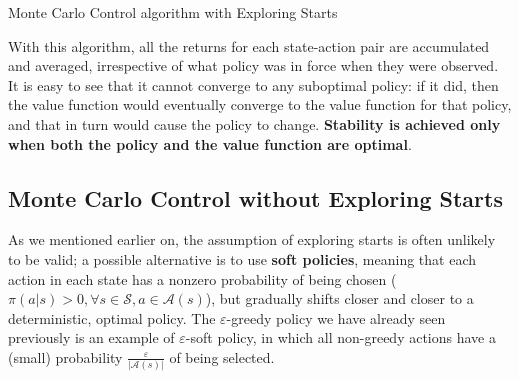 \begin{algorithm}[H]
\DontPrintSemicolon
\SetAlgoVlined
{}

 \caption{Monte Carlo Control algorithm with Exploring Starts}
\end{algorithm}

With this algorithm, all the returns for each state-action pair are accumulated and averaged, irrespective of what policy was in force when they were observed. It is easy to see that it cannot converge to any suboptimal policy: if it did, then the value function would eventually converge to the value function for that policy, and that in turn would cause the policy to change. \textbf{Stability is achieved only when both the policy and the value function are optimal}.

\subsection{Monte Carlo Control without Exploring Starts}
As we mentioned earlier on, the assumption of exploring starts is often unlikely to be valid; a possible alternative is to use \textbf{soft policies}, meaning that each action in each state has a nonzero probability of being chosen ($\pi(a \vert s) > 0, \forall s\in\mathcal{S},a\in\mathcal{A}(s)$), but gradually shifts closer and closer to a deterministic, optimal policy. The $\varepsilon$-greedy policy we have already seen previously is an example of $\varepsilon$-soft policy, in which all non-greedy actions have a (small) probability $\frac{\varepsilon}{\left\vert \mathcal{A}(s) \right\vert}$ of being selected.

